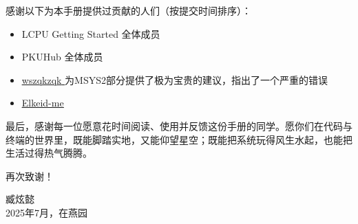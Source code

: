 \documentclass[12pt, openany]{book}
\let\oldhref\href
\renewcommand{\href}[2]{%
  \oldhref{#1}{%
    \color{blue}\underline{#2}%
    \raisebox{0.2ex}{\tiny$\nearrow$}%
  }%
}
\begin{document}
感谢以下为本手册提供过贡献的人们（按提交时间排序）：

\begin{itemize}
  \item LCPU Getting Started 全体成员
  \item PKUHub 全体成员
  \item \faGithub\href{https://github.com/wszqkzqk}{wszqkzqk}为MSYS2部分提供了极为宝贵的建议，指出了一个严重的错误
  \item \faGithub\href{https://github.com/Elkeid-me}{Elkeid-me}
\end{itemize}

最后，感谢每一位愿意花时间阅读、使用并反馈这份手册的同学。愿你们在代码与终端的世界里，既能脚踏实地，又能仰望星空；既能把系统玩得风生水起，也能把生活过得热气腾腾。

再次致谢！

\vspace{2em}
\begin{flushright}
  臧炫懿 \\
  2025年7月，在燕园
\end{flushright}
\end{document}
